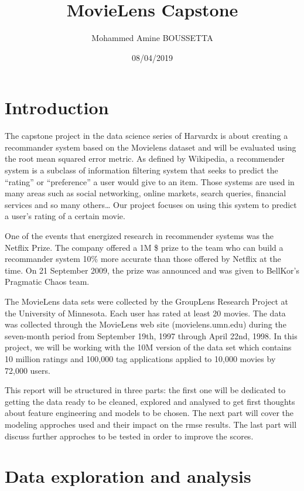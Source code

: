 \documentclass[]{article}
\title{MovieLens Capstone}
\author{Mohammed Amine BOUSSETTA}
\date{08/04/2019}
\begin{document}
\maketitle

\section{Introduction}\label{introduction}

The capstone project in the data science series of Harvardx is about
creating a recommander system based on the Movielens dataset and will be
evaluated using the root mean squared error metric. As defined by
Wikipedia, a recommender system is a subclass of information filtering
system that seeks to predict the ``rating'' or ``preference'' a user
would give to an item. Those systems are used in many areas such as
social networking, online markets, search queries, financial services
and so many others\ldots{} Our project focuses on using this system to
predict a user's rating of a certain movie.

One of the events that energized research in recommender systems was the
Netflix Prize. The company offered a 1M \$ prize to the team who can
build a recommander system 10\% more accurate than those offered by
Netflix at the time. On 21 September 2009, the prize was announced and
was given to BellKor's Pragmatic Chaos team.

The MovieLens data sets were collected by the GroupLens Research Project
at the University of Minnesota. Each user has rated at least 20 movies.
The data was collected through the MovieLens web site
(movielens.umn.edu) during the seven-month period from September 19th,
1997 through April 22nd, 1998. In this project, we will be working with
the 10M version of the data set which contains 10 million ratings and
100,000 tag applications applied to 10,000 movies by 72,000 users.

This report will be structured in three parts: the first one will be
dedicated to getting the data ready to be cleaned, explored and analysed
to get first thoughts about feature engineering and models to be chosen.
The next part will cover the modeling approches used and their impact on
the rmse results. The last part will discuss further approches to be
tested in order to improve the scores.

\section{Data exploration and
analysis}\label{data-exploration-and-analysis}
\end{document}
